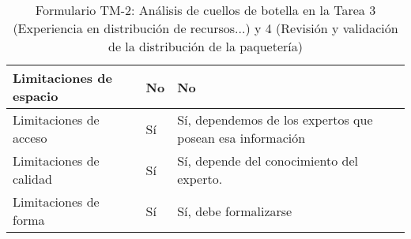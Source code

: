 \begin{table}[H]
{\begin{tabular}{|l|l|l|}
		Limitaciones de espacio& \multicolumn{1}{p{1.0cm}|}{No} & \multicolumn{1}{p{13.0cm}|}{No}\\
		\hline

		Limitaciones de acceso& \multicolumn{1}{p{1.0cm}|}{Sí} & \multicolumn{1}{p{13.0cm}|}{Sí, dependemos de los expertos que posean esa información}\\
		\hline

		Limitaciones de calidad& \multicolumn{1}{p{1.0cm}|}{Sí} & \multicolumn{1}{p{13.0cm}|}{Sí, depende del conocimiento del experto.}\\
		\hline

		Limitaciones de forma& \multicolumn{1}{p{1.0cm}|}{Sí} & \multicolumn{1}{p{13.0cm}|}{Sí, debe formalizarse}\\
		\hline

	  \end{tabular}
	}
	\caption{\label{tab:TM22}Formulario TM-2: Análisis de cuellos de botella en la Tarea 3 (Experiencia en distribución de recursos...) y 4 (Revisión y validación de la distribución de la paquetería)}
  \end{table}
  \newpage


